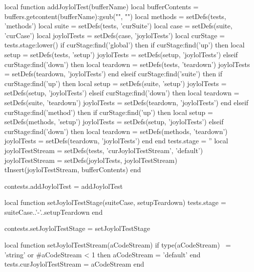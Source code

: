 \def\addJoylolTestLibDir#1{
  \directlua{
    thirddata.contests.addJoylolTestLibDir('#1')
  }
}

\def\addJoylolTestLib#1{
  \directlua{
    thirddata.contests.addJoylolTestLib('#1')
  }
}

\def\createJoylolTestFile#1#2#3{
  \directlua{
    thirddata.contests.createJoylolTestFile('#1', '#2', '#3')
  }
}

\def\addJoylolTestTargets#1{
  \directlua{
    thirddata.contests.addJoylolTestTargets('#1')
  }
}
\stopMkIVCode

\startLuaCode
local function addJoylolTest(bufferName)
  local bufferContents = buffers.getcontent(bufferName):gsub("", "\n")
  local methods        = setDefs(tests, 'methods')
  local suite          = setDefs(tests, 'curSuite')
  local case           = setDefs(suite, 'curCase')
  local joylolTests    = setDefs(case,  'joylolTests')
  local curStage       = tests.stage:lower()
  if curStage:find('global') then
    if curStage:find('up') then
      local setup      = setDefs(tests,    'setup')
      joylolTests      = setDefs(setup,    'joylolTests')
    elseif curStage:find('down') then
      local teardown   = setDefs(tests,    'teardown')
      joylolTests      = setDefs(teardown, 'joylolTests')
    end
  elseif curStage:find('suite') then
    if curStage:find('up') then
      local setup      = setDefs(suite,    'setup')
      joylolTests      = setDefs(setup,    'joylolTests')
    elseif curStage:find('down') then
      local teardown   = setDefs(suite,    'teardown')
      joylolTests      = setDefs(teardown, 'joylolTests')
    end
  elseif curStage:find('method') then
    if curStage:find('up') then
      local setup      = setDefs(methods,  'setup')
      joylolTests      = setDefs(setup,    'joylolTests')
    elseif curStage:find('down') then
      local teardown   = setDefs(methods,  'teardown')
      joylolTests      = setDefs(teardown, 'joylolTests')
    end
  end
  tests.stage            = ''
  local joylolTestStream = setDefs(tests, 'curJoylolTestStream', 'default')
  joylolTestStream       = setDefs(joylolTests, joylolTestStream)
  tInsert(joylolTestStream, bufferContents)
end

contests.addJoylolTest = addJoylolTest

local function setJoylolTestStage(suiteCase, setupTeardown)
  tests.stage = suiteCase..'-'..setupTeardown
end

contests.setJoylolTestStage = setJoylolTestStage

local function setJoylolTestStream(aCodeStream)
  if type(aCodeStream) ~= 'string'
    or #aCodeStream < 1 then
    aCodeStream = 'default'
  end
  tests.curJoylolTestStream = aCodeStream
end

